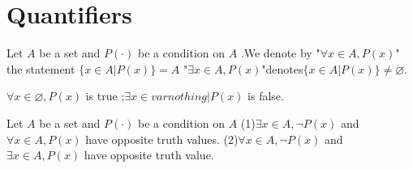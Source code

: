 \documentclass{book}
\begin{document}
\section{Quantifiers}
\begin{definitionenv}
    Let $A$ be a set and $P(\cdot)$ be a condition on $A$ .We denote by 
    \newline
    "$\forall x\in A, P(x)$" the statement $\{x\in A|P(x)\}=A$
    \newline
    "$\exists x\in A,P(x)$"denotes$\{x\in A|P(x)\}\not= \varnothing$.
\end{definitionenv}
\begin{exampleenv}
    $\forall x\in \varnothing ,P(x)$ is true ;$\exists x\in varnothing|P(x)$ is false.
\end{exampleenv}
\begin{theoremenv}\label{theorem2.4.1}
    Let $A$ be a set and $P(\cdot)$ be a condition on $A$
    \newline
    (1)$\exists x\in A,\neg P(x) $ and $ \forall x\in A,P(x)$ have opposite truth values.
    \newline
    (2)$\forall x\in A,\neg P(x)$ and $\exists x\in A,P(x)$ have opposite truth value.
\end{theoremenv}
\end{document}
